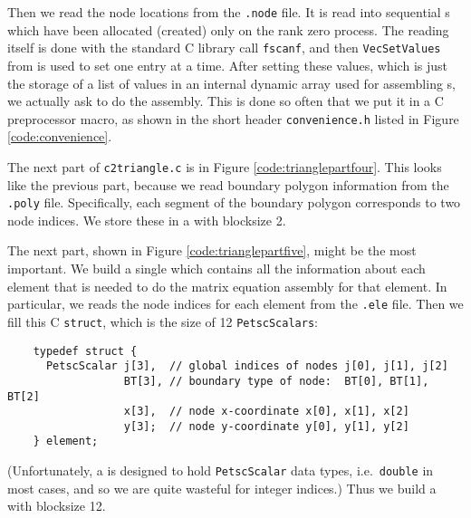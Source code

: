 
Then we read the node locations from the \texttt{.node} file.  It is read into sequential \PETSc \pVec s which have been allocated (created) only on the rank zero process.  The reading itself is done with the standard C library call \texttt{fscanf}, and then \texttt{VecSetValues} from \PETSc is used to set one \pVec entry at a time.  After setting these values, which is just the storage of a list of values in an internal \PETSc dynamic array used for assembling \pVec s, we actually ask \PETSc to do the assembly.  This is done so often that we put it in a C preprocessor macro, as shown in the short header \texttt{convenience.h} listed in Figure \ref{code:convenience}.


The next part of \texttt{c2triangle.c} is in Figure \ref{code:trianglepartfour}.  This looks like the previous part, because we read boundary polygon information from the \texttt{.poly} file.  Specifically, each segment of the boundary polygon corresponds to two node indices.  We store these in a \pVec with blocksize 2.


The next part, shown in Figure \ref{code:trianglepartfive}, might be the most important.  We build a single \pVec which contains all the information about each element that is needed to do the matrix equation assembly for that element.  In particular, we reads the node indices for each element from the \texttt{.ele} file.  Then we fill this C \texttt{struct}, which is the size of 12 \texttt{PetscScalars}:
\begin{Verbatim}
    typedef struct {
      PetscScalar j[3],  // global indices of nodes j[0], j[1], j[2]
                  BT[3], // boundary type of node:  BT[0], BT[1], BT[2]
                  x[3],  // node x-coordinate x[0], x[1], x[2]
                  y[3];  // node y-coordinate y[0], y[1], y[2]
    } element;
\end{Verbatim}
(Unfortunately, a \PETSc \pVec is designed to hold \texttt{PetscScalar} data types, i.e.~\texttt{double} in most cases, and so we are quite wasteful for integer indices.)  Thus we build a \pVec with blocksize 12.

